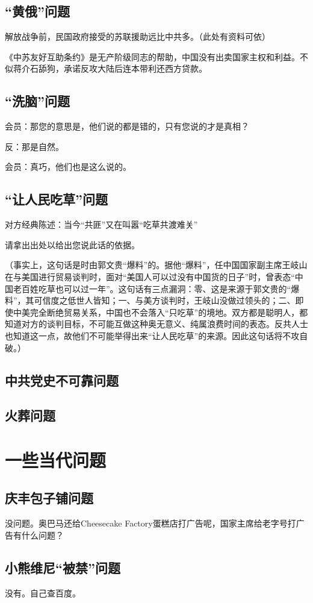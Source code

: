 \documentclass[UTF8,a4paper]{ctexart}
\begin{document}
\subsection{“黄俄”问题}
解放战争前，民国政府接受的苏联援助远比中共多。（此处有资料可依）

《中苏友好互助条约》是无产阶级同志的帮助，中国没有出卖国家主权和利益。不似蒋介石舔狗，承诺反攻大陆后连本带利还西方贷款。
\subsection{“洗脑”问题}
会员：那您的意思是，他们说的都是错的，只有您说的才是真相？

反：那是自然。

会员：真巧，他们也是这么说的。
\subsection{“让人民吃草”问题}
对方经典陈述：当今“共匪”又在叫嚣“吃草共渡难关”

请拿出出处以给出您说此话的依据。

（事实上，这句话是时由郭文贵“爆料”的。据他“爆料”，任中国国家副主席王岐山在与美国进行贸易谈判时，面对“美国人可以过没有中国货的日子”时，曾表态“中国老百姓吃草也可以过一年”。这句话有三点漏洞：零、这是来源于郭文贵的“爆料”，其可信度之低世人皆知；一、与美方谈判时，王岐山没做过领头的；二、即使中美完全断绝贸易关系，中国也不会落入“只吃草”的境地。双方都是聪明人，都知道对方的谈判目标，不可能互做这种奥无意义、纯属浪费时间的表态。反共人士也知道这一点，故他们不可能举得出来“让人民吃草”的来源。因此这句话将不攻自破。）
\subsection{中共党史不可靠问题}
\subsection{火葬问题}

\section{一些当代问题}
\subsection{庆丰包子铺问题}
没问题。奥巴马还给Cheesecake Factory蛋糕店打广告呢，国家主席给老字号打广告有什么问题？
\subsection{小熊维尼“被禁”问题}
没有。自己查百度。
\end{document}
